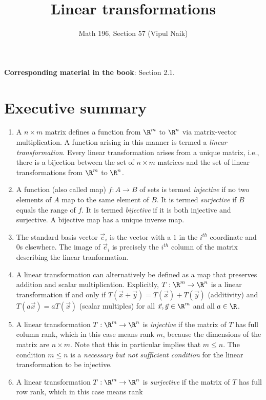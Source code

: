 \documentclass[10pt]{amsart}
\title{Linear transformations}
\author{Math 196, Section 57 (Vipul Naik)}
\begin{document}
\maketitle

{\bf Corresponding material in the book}: Section 2.1.

\section*{Executive summary}


\begin{enumerate}
\item A $n \times m$ matrix defines a function from $\R^m$ to $\R^n$
  via matrix-vector multiplication. A function arising in this manner
  is termed a {\em linear transformation}. Every linear transformation
  arises from a unique matrix, i.e., there is a bijection between the
  set of $n \times m$ matrices and the set of linear transformations
  from $\R^m$ to $\R^n$.
\item A function (also called map) $f: A \to B$ of sets is termed {\em
  injective} if no two elements of $A$ map to the same element of
  $B$. It is termed {\em surjective} if $B$ equals the range of
  $f$. It is termed {\em bijective} if it is both injective and
  surjective. A bijective map has a unique inverse map.
\item The standard basis vector $\vec{e}_i$ is the vector with a $1$
  in the $i^{th}$ coordinate and $0$s elsewhere. The image of
  $\vec{e}_i$ is precisely the $i^{th}$ column of the matrix
  describing the linear tranformation.
\item A linear transformation can alternatively be defined as a map
  that preserves addition and scalar multiplication. Explicitly, $T:
  \R^m \to \R^n$ is a linear transformation if and only if $T(\vec{x}
  + \vec{y}) = T(\vec{x}) + T(\vec{y})$ (additivity) and $T(a\vec{x})
  = aT(\vec{x})$ (scalar multiples) for all $\vec{x},\vec{y} \in \R^m$
  and all $a \in \R$.
\item A linear transformation $T:\R^m \to \R^n$ is {\em injective} if
  the matrix of $T$ has full column rank, which in this case means
  rank $m$, because the dimensions of the matrix are $n \times
  m$. Note that this in particular implies that $m \le n$. The
  condition $m \le n$ is a {\em necessary but not sufficient
    condition} for the linear transformation to be injective.
\item A linear transformation $T:\R^m \to \R^n$ is {\em surjective} if
  the matrix of $T$ has full row rank, which in this case means rank

\end{enumerate}
\end{document}
